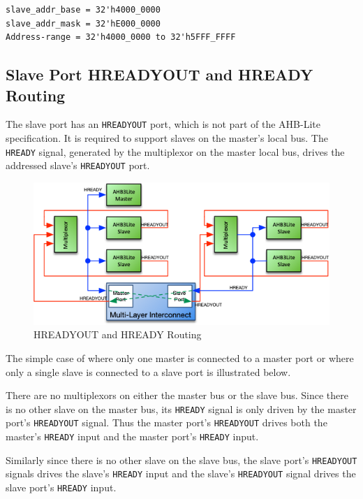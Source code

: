 \begin{verbatim}
slave_addr_base = 32'h4000_0000
slave_addr_mask = 32'hE000_0000
Address-range = 32'h4000_0000 to 32'h5FFF_FFFF
\end{verbatim}

\subsection{Slave Port HREADYOUT and HREADY
Routing}\label{slave-port-hreadyout-and-hready-routing}

The slave port has an \texttt{HREADYOUT} port, which is not part of the AHB-Lite
specification. It is required to support slaves on the master's local
bus. The \texttt{HREADY} signal, generated by the multiplexor on the master local bus, drives the addressed slave’s \texttt{HREADYOUT} port.

\begin{figure}[thb]
	\centering
	\includegraphics[]{assets/img/ahb-lite-switch-sys4}
	\caption{HREADYOUT and HREADY Routing}
	\label{fig:hready-hready-routing}
\end{figure}

The simple case of where only one master is connected to a master port
or where only a single slave is connected to a slave port is illustrated
below.

There are no multiplexors on either the master bus or the slave bus.
Since there is no other slave on the master bus, its \texttt{HREADY} signal is
only driven by the master port's \texttt{HREADYOUT} signal. Thus the master
port's \texttt{HREADYOUT} drives both the master's \texttt{HREADY} input and the master
port's \texttt{HREADY} input.

Similarly since there is no other slave on the slave bus, the slave
port's \texttt{HREADYOUT} signals drives the slave's \texttt{HREADY} input and the slave's
\texttt{HREADYOUT} signal drives the slave port's \texttt{HREADY} input.

